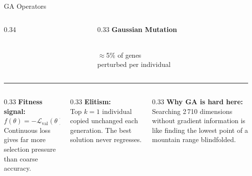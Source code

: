\documentclass[aspectratio=169,10pt]{beamer}
\begin{document}
\begin{frame}{GA Operators}
\begin{columns}[T]
\begin{column}{0.34\textwidth}
    \end{column}
    \begin{column}{0.33\textwidth}
      \centering
      \textbf{\small Gaussian Mutation}\\[5pt]
      \vspace{4pt}\\
      \scriptsize $\approx$5\% of genes\\perturbed per individual
    \end{column}
  \end{columns}

  \vspace{0.3em}
  \noindent\rule{\textwidth}{0.3pt}
  \vspace{0.15em}

  \begin{columns}[T]
    \begin{column}{0.33\textwidth}
      \textbf{Fitness signal:}\\[2pt]
      \small $f(\theta) = -\mathcal{L}_{\mathrm{val}}(\theta)$\\[2pt]
      Continuous loss gives far more selection pressure than coarse accuracy.
    \end{column}
    \begin{column}{0.33\textwidth}
      \textbf{Elitism:}\\[2pt]
      \small Top $k=1$ individual copied unchanged each generation. The best solution never regresses.
    \end{column}
    \begin{column}{0.33\textwidth}
      \textbf{Why GA is hard here:}\\[2pt]
      \small Searching 2\,710 dimensions without gradient information is like finding the lowest point of a mountain range blindfolded.
    \end{column}
  \end{columns}
\end{frame}
\end{document}
